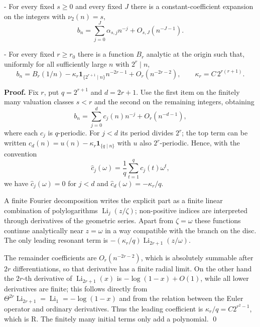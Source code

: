 \documentclass[11pt]{article}
\begin{document}
- For every fixed $s\ge0$ and every fixed $J$ there is a constant-coefficient expansion on the integers with $\nu_2(n)=s$,
\[
b_n=\sum_{j=0}^J\alpha_{s,j}n^{-j}+O_{s,J}(n^{-J-1}).
\]

- For every fixed $r\ge r_0$ there is a function $B_r$ analytic at the origin such that, uniformly for all sufficiently large $n$ with $2^r\mid n$,
\[
b_n=B_r(1/n)-\kappa_r\mathbf1_{\{2^{r+1}\mid n\}}n^{-2r-1}+O_r(n^{-2r-2}),\qquad \kappa_r=C\,2^{r(r+1)}.
\]

\textbf{Proof.} Fix $r$, put $q=2^{r+1}$ and $d=2r+1$. Use the first item on the finitely many valuation classes $s<r$ and the second on the remaining integers, obtaining
\[
b_n=\sum_{j=0}^{d}c_j(n)n^{-j}+O_r(n^{-d-1}),
\]
where each $c_j$ is $q$-periodic. For $j<d$ its period divides $2^r$; the top term can be written $c_d(n)=u(n)-\kappa_r\mathbf1_{\{q\mid n\}}$ with $u$ also $2^r$-periodic. Hence, with the convention
\[
\widehat c_j(\omega)=\frac1q\sum_{t=1}^{q}c_j(t)\omega^t,
\]
we have $\widehat c_j(\omega)=0$ for $j<d$ and $\widehat c_d(\omega)=-\kappa_r/q$.

A finite Fourier decomposition writes the explicit part as a finite linear combination of polylogarithms $\operatorname{Li}_j(z/\zeta)$; non-positive indices are interpreted through derivatives of the geometric series. Apart from $\zeta=\omega$ these functions continue analytically near $z=\omega$ in a way compatible with the branch on the disc. The only leading resonant term is $-(\kappa_r/q)\operatorname{Li}_{2r+1}(z/\omega)$.

The remainder coefficients are $O_r(n^{-2r-2})$, which is absolutely summable after $2r$ differentiations, so that derivative has a finite radial limit. On the other hand the $2r$-th derivative of $\operatorname{Li}_{2r+1}(x)$ is $-\log(1-x)+O(1)$, while all lower derivatives are finite; this follows directly from $\Theta^{2r}\operatorname{Li}_{2r+1}=\operatorname{Li}_1=-\log(1-x)$ and from the relation between the Euler operator and ordinary derivatives. Thus the leading coefficient is $\kappa_r/q=C2^{r^2-1}$, which is R. The finitely many initial terms only add a polynomial. \qed
\end{document}
